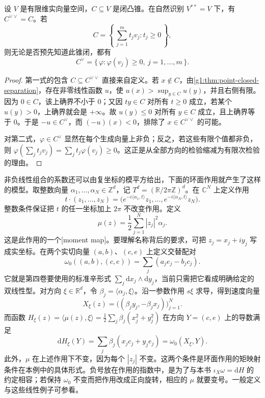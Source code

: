 \begin{proposition}\label{g1:prop:dual-cone-bipolar}
	设 \(V\) 是有限维实向量空间，\(C\subseteq V\) 是闭凸锥。在自然识别 \(V^{**}=V\) 下，有 \(C^{\vee\vee}=C\)。若
	\[
		C=\left\{\,\sum_{j=1}^m t_jv_j:t_j\ge0\,\right\},
	\]
	则无论是否预先知道此锥闭，都有
	\[
		C^\vee=\{\,\varphi:\varphi(v_j)\ge0,\ j=1,\ldots,m\,\}.
	\]
\end{proposition}
\begin{proof}
	第一式的包含 \(C\subseteq C^{\vee\vee}\) 直接来自定义。若 \(x\notin C\)，由\cref{g1:thm:point-closed-separation}，存在非零线性函数 \(u\)，使 \(u(x)>\sup_{y\in C}u(y)\)，并且右侧有限。因为 \(0\in C\)，该上确界不小于 \(0\)；又因 \(ty\in C\) 对所有 \(t\ge0\) 成立，若某个 \(u(y)>0\)，上确界就会是 \(+\infty\)。故 \(u(y)\le0\) 对所有 \(y\in C\) 成立，且上确界等于 \(0\)。于是 \(-u\in C^\vee\)，而 \((-u)(x)<0\)，排除了 \(x\in C^{\vee\vee}\) 的可能。

	对第二式，\(\varphi\in C^\vee\) 显然在每个生成向量上非负；反之，若这些有限个值都非负，则 \(\varphi(\sum_jt_jv_j)=\sum_jt_j\varphi(v_j)\ge0\)。这正是从全部方向的检验缩减为有限次检验的理由。
\end{proof}

非负线性组合的系数还可以由复坐标的模平方给出，下面的环面作用就产生了这样的模型。取整数向量 \(\alpha_1,\ldots,\alpha_N\in\mathbb Z^d\)，记 \(T^d=(\mathbb R/2\pi\mathbb Z)^d\)。在 \(\mathbb C^N\) 上定义作用
\[
	t\cdot(z_1,\ldots,z_N)=
	\bigl(e^{-i\langle\alpha_1,t\rangle}z_1,\ldots,e^{-i\langle\alpha_N,t\rangle}z_N\bigr).
\]
整数条件保证把 \(t\) 的任一坐标加上 \(2\pi\) 不改变作用。定义
\begin{equation}\label{g1:eq:linear-moment-map}
	\mu(z)=\frac12\sum_{j=1}^N|z_j|^2\alpha_j.
\end{equation}
这是此作用的一个[moment map]。要理解名称背后的要求，可把 \(z_j=x_j+iy_j\) 写成实坐标。在两个实切向量 \((a,b)\)、\((c,e)\) 上定义交替配对
\[
	\omega_0((a,b),(c,e))=\sum_j(a_je_j-b_jc_j).
\]
它就是第四卷要使用的标准辛形式 \(\sum_j\mathrm{d}x_j\wedge \mathrm{d}y_j\)，当前只需把它看成明确给定的双线性型。对方向 \(\xi\in\mathbb R^d\)，令 \(\beta_j=\langle\alpha_j,\xi\rangle\)。沿一参数作用 \(s\xi\) 求导，得到速度向量
\[
	X_\xi(z)=\bigl((\beta_jy_j,-\beta_jx_j)\bigr)_{j=1}^N.
\]
而函数 \(H_\xi(z)=\langle\mu(z),\xi\rangle=\frac12\sum_j\beta_j(x_j^2+y_j^2)\) 在方向 \(Y=(c,e)\) 上的导数满足
\[
	\mathrm{d}H_\xi(Y)=\sum_j\beta_j(x_jc_j+y_je_j)=\omega_0(X_\xi,Y).
\]
此外，\(\mu\) 在上述作用下不变，因为每个 \(|z_j|\) 不变。这两个条件是环面作用的矩映射条件在本例中的具体形式。负号放在作用的指数中，是为了与本书 \(\iota_X\omega=\mathrm{d}H\) 的约定相容；若保持 \(\omega_0\) 不变而把作用改成正向旋转，相应的 \(\mu\) 就要变号。一般定义与这些线性例子可参看\cite[第5.6节]{Cannas2006Symplectic}。

